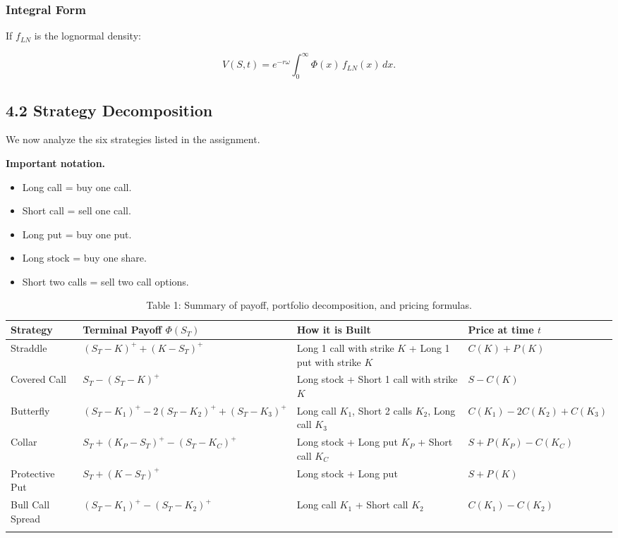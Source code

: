 \documentclass[11pt]{article}
\begin{document}
\subsubsection*{Integral Form}

If $f_{LN}$ is the lognormal density:

\[
V(S,t)=e^{-r\omega}\int_0^\infty \Phi(x)\,f_{LN}(x)\,dx.
\]

\subsection*{4.2 Strategy Decomposition}

We now analyze the six strategies listed in the assignment.

\bigskip
\textbf{Important notation.}

\begin{itemize}[leftmargin=1.8cm]
\item Long call = buy one call.
\item Short call = sell one call.
\item Long put = buy one put.
\item Long stock = buy one share.
\item Short two calls = sell two call options.
\end{itemize}



\begin{center}
\small
\begin{longtable}{p{2.8cm} p{4.3cm} p{5.2cm} p{3.2cm}}
\toprule
\textbf{Strategy} & \textbf{Terminal Payoff $\Phi(S_T)$} & \textbf{How it is Built} & \textbf{Price at time $t$} \\
\midrule
\endfirsthead



Straddle
&
$(S_T-K)^+ + (K-S_T)^+$
&
Long 1 call with strike $K$ + Long 1 put with strike $K$
&
$C(K)+P(K)$
\\

Covered Call
&
$S_T-(S_T-K)^+$
&
Long stock + Short 1 call with strike $K$
&
$S-C(K)$
\\

Butterfly
&
$(S_T-K_1)^+-2(S_T-K_2)^++(S_T-K_3)^+$
&
Long call $K_1$, Short 2 calls $K_2$, Long call $K_3$
&
$C(K_1)-2C(K_2)+C(K_3)$
\\

Collar
&
$S_T+(K_P-S_T)^+-(S_T-K_C)^+$
&
Long stock + Long put $K_P$ + Short call $K_C$
&
$S+P(K_P)-C(K_C)$
\\

Protective Put
&
$S_T+(K-S_T)^+$
&
Long stock + Long put
&
$S+P(K)$
\\

Bull Call Spread
&
$(S_T-K_1)^+-(S_T-K_2)^+$
&
Long call $K_1$ + Short call $K_2$
&
$C(K_1)-C(K_2)$
\\

\bottomrule
\caption{Table 1: Summary of payoff, portfolio decomposition, and pricing formulas.}
\end{longtable}
\end{center}
\end{document}
